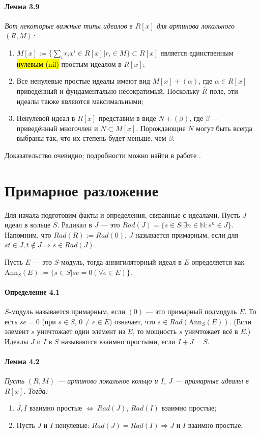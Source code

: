 \documentclass[a4paper,12pt]{article}
\newcommand{\Ann}{\text{Ann}}
\begin{document}
\paragraph{Лемма 3.9}{\itshape
Вот некоторые важные типы идеалов в $R[x]$ для артинова локального $(R, M)$:

\renewcommand{\labelenumi}{(\asbuk{enumi})}
\begin{enumerate}
	\item $M[x] := \{\sum_i r_i x^i \in R[x] | r_i \in M \} \subset R[x]$ является единственным \hl{нулевым (nil)} простым идеалом в $R[x]$;
	\item Все ненулевые простые идеалы имеют вид $M[x] + (\alpha)$, где $\alpha \in R[x]$ приведённый и фундаментально несократимый. Поскольку $\overline{R}$ поле, эти идеалы также являются максимальными;
	\item Ненулевой идеал в $R[x]$ представим в виде $N + (\beta)$, где $\beta$ --- приведённый многочлен и $N \subset M[x]$. Порождающие $N$ могут быть всегда выбраны так, что их степень будет меньше, чем $\beta$.
\end{enumerate}
}

Доказательство очевидно; подробности можно найти в работе \cite{bib11}.

\section{Примарное разложение}
Для начала подготовим факты и определения, связанные с идеалами. Пусть $J$ --- идеал в кольце $S$.
Радикал в $J$ --- это $Rad(J) = \{s \in S | \exists n \in \mathbb{N}: s^n \in J\}$. Напомним, что $Rad(R) := Rad(0)$. $J$ называется примарным, если для $s t \in J, t \notin J \Rightarrow s \in Rad(J)$.

Пусть $E$ --- это $S$-модуль, тогда аннигиляторный идеал в $E$ определяется как $\Ann_S(E) := \{s \in S | s e = 0 (\forall e \in E)\}$.

\paragraph{Определение 4.1}
$S$-модуль называется примарным, если $(0)$ --- это примарный подмодуль $E$. То есть $s e = 0$ (при $s \in S$, $0 \ne e \in E$) означает, что $s \in Rad(\Ann_S(E))$. (Если элемент $s$ уничтожает один элемент из $E$, то мощность $s$ уничтожает всё в $E$.) Идеалы $J$ и $I$ в $S$ называются взаимно простыми, если $I + J = S$.

\paragraph{Лемма 4.2}
{\itshape
Пусть $(R, M)$ --- артиново локальное кольцо и $I$, $J$ --- примарные идеалы в $R[x]$. Тогда:
\renewcommand{\labelenumi}{(\asbuk{enumi})}
\begin{enumerate}
	\item $J, I$ взаимно простые $\Leftrightarrow ~ Rad(J)$, $Rad(I)$ взаимно простые;
	\item Пусть $J$ и $I$ ненулевые: $Rad(J) = Rad(I) \Rightarrow J$ и $I$ взаимно простые.
\end{enumerate}
}
\end{document}
